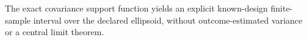 The exact covariance support function yields an explicit known-design finite-sample interval over the declared ellipsoid, without outcome-estimated variance or a central limit theorem.